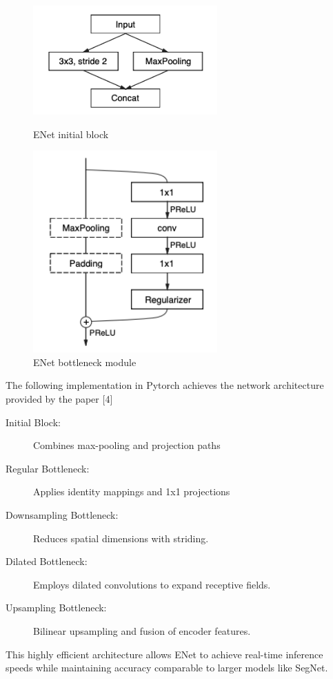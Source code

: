 \begin{figure}[H]
    \begin{minipage}[t]{7.2cm}
        \begin{center}
            \includegraphics[width=200pt]{assets/enet/first.png}
            \caption{ENet initial block}
            \label{fig:using:enetinit}
        \end{center}
    \end{minipage}
    \hfill
    \begin{minipage}[t]{7.2cm}
        \begin{center}
            \includegraphics[width=200pt]{assets/enet/second.png}
            \caption{ENet bottleneck module}
            \label{fig:using:enetbottle}
        \end{center}
    \end{minipage}
\end{figure}

The following implementation in Pytorch achieves the network architecture provided by the paper [4]
\begin{description}
    \item[Initial Block:] Combines max-pooling and projection paths
    \item[Regular Bottleneck:] Applies identity mappings and 1x1 projections
    \item[Downsampling Bottleneck:] Reduces spatial dimensions with striding.
    \item[Dilated Bottleneck:] Employs dilated convolutions to expand receptive fields.
    \item[Upsampling Bottleneck:] Bilinear upsampling and fusion of encoder features.
\end{description}
This highly efficient architecture allows ENet to achieve real-time inference speeds while maintaining accuracy comparable to larger models like SegNet.

